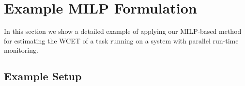 
\section{Example MILP Formulation}
\label{sec:monitoring_wcet.example}

In this section we show a detailed example of applying our MILP-based method
for estimating the WCET of a task running on a system with parallel run-time
monitoring.

\subsection{Example Setup}

